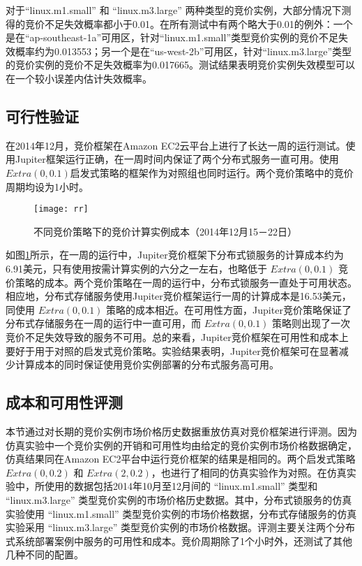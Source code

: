 对于``linux.m1.small'' 和 ``linux.m3.large'' 两种类型的竞价实例，大部分情况下测得的竞价不足失效概率都小于0.01。在所有测试中有两个略大于0.01的例外：一个是在``ap-southeast-1a''可用区，针对``linux.m1.small''类型竞价实例的竞价不足失效概率约为0.013553；另一个是在``us-west-2b''可用区，针对``linux.m3.large''类型的竞价实例的竞价不足失效概率为0.017665。测试结果表明竞价实例失效模型可以在一个较小误差内估计失效概率。

\subsection{可行性验证}
在2014年12月，竞价框架在Amazon EC2云平台上进行了长达一周的运行测试。使用Jupiter框架运行正确，在一周时间内保证了两个分布式服务一直可用。使用$Extra(0, 0.1)$启发式策略的框架作为对照组也同时运行。两个竞价策略中的竞价周期均设为1小时。
\begin{figure}
  \centering
  \texttt{[image: rr]}
  \caption{不同竞价策略下的竞价计算实例成本（2014年12月15－22日）}
  \label{figure:rr}
\end{figure}

如图\ref{figure:rr}所示，在一周的运行中，Jupiter竞价框架下分布式锁服务的计算成本约为6.91美元，只有使用按需计算实例的六分之一左右，也略低于 $Extra(0, 0.1)$ 竞价策略的成本。两个竞价策略在一周的运行中，分布式锁服务一直处于可用状态。相应地，分布式存储服务使用Jupiter竞价框架运行一周的计算成本是16.53美元，同使用 $Extra(0, 0.1)$ 策略的成本相近。在可用性方面，Jupiter竞价策略保证了分布式存储服务在一周的运行中一直可用，而 $Extra(0, 0.1)$ 策略则出现了一次竞价不足失效导致的服务不可用。总的来看，Jupiter竞价框架在可用性和成本上要好于用于对照的启发式竞价策略。实验结果表明，Jupiter竞价框架可在显著减少计算成本的同时保证使用竞价实例部署的分布式服务高可用。

\subsection{成本和可用性评测}
\label{subsec:ca}
本节通过对长期的竞价实例市场价格历史数据重放仿真对竞价框架进行评测。因为仿真实验中一个竞价实例的开销和可用性均由给定的竞价实例市场价格数据确定，仿真结果同在Amazon EC2平台中运行竞价框架的结果是相同的。两个启发式策略 $Extra(0, 0.2)$ 和 $Extra(2, 0.2)$，也进行了相同的仿真实验作为对照。在仿真实验中，所使用的数据包括2014年10月至12月间的 ``linux.m1.small'' 类型和 ``linux.m3.large'' 类型竞价实例的市场价格历史数据。其中，分布式锁服务的仿真实验使用 ``linux.m1.small'' 类型竞价实例的市场价格数据，分布式存储服务的仿真实验采用 ``linux.m3.large'' 类型竞价实例的市场价格数据。评测主要关注两个分布式系统部署案例中服务的可用性和成本。竞价周期除了1个小时外，还测试了其他几种不同的配置。

